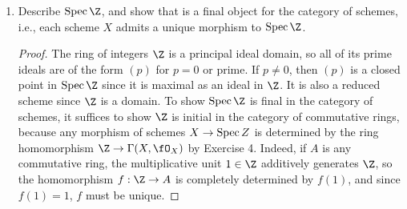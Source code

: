 \documentclass[a4paper]{article}
\begin{document}
\begin{enumerate} [label=\textbf{\arabic*.}, leftmargin=0em]
\begin{proof}
    We want to show the homomorphism between global sections $A \to \Gamma(X, \fO_X)$ completely determines the morphism $f : X \to \spec{B}$. We can check this locally on $X$. Let $V = \spec{B}$ be an open affine subset of $X$. We also have a homomorphism of global sections $A \to \Gamma(V, \fO_X) = B$ by composing with the inclusion morphism, which fits into the following commutative diagram
    \[ \begin{tikzcd}
        & {\Gamma(X, \fO_X)} \arrow[rd] &                               \\
A \arrow[ru] \arrow[rr] &                               & {\Gamma(\spec{B}, \fO_X) = B}
    \end{tikzcd} \]
    where $\Gamma(X, \fO_X) \to B$ is the natural restriction homomorphism. By equivalence of the category of rings and affine schemes, we conclude that $\alpha$ is injective.

    It remains to show $\alpha$ is surjective. Let $\varphi : A \to \Gamma(X, \fO_X)$ be a homomorphism of global sections. For each $x \in X$, let $\goth{m}_x$ be the maximal ideal of $\fO_{x, X}$, and let $i_x : \Gamma(X, \fO_X) \to \fO_{x, X}$ be the natural map. Then define $\tilde{\varphi} : X \to \spec{A}$ by $x \mapsto (i_x \circ \varphi)^{-1}(\goth{m}_x)$. This coincides with the case when $X$ is affine. Indeed, suppose $X = \spec{B}$ for some ring $B$, and let $\goth{p} \in \spec{B}$ corresponding to $x$. The inclusion homeomorphism $i_x : \Gamma(X, \fO_X) \to \fO_{x, X}$ is precisely the natural map $i_\goth{p} : B \to B_\goth{p}$ associated to localization. Thus, $i_x(\gm_x) = \goth{p} \in B$, and $\tilde{\varphi}(x) = \varphi^{-1}(\goth{p})$.
\end{proof}

\item Describe $\spec{\Z}$, and show that is a final object for the category of schemes, i.e., each scheme $X$ admits a unique morphism to $\spec{\Z}$.

\begin{proof}
    The ring of integers $\Z$ is a principal ideal domain, so all of its prime ideals are of the form $(p)$ for $p = 0$ or prime. If $p \neq 0$, then $(p)$ is a closed point in $\spec{\Z}$ since it is maximal as an ideal in $\Z$. It is also a reduced scheme since $\Z$ is a domain. To show $\spec{\Z}$ is final in the category of schemes, it suffices to show $\Z$ is initial in the category of commutative rings, because any morphism of schemes $X \to \operatorname{Spec}{Z}$ is determined by the ring homomorphism $\Z \to \Gamma(X, \fO_X)$ by Exercise 4. Indeed, if $A$ is any commutative ring, the multiplicative unit $1 \in \Z$ additively generates $\Z$, so the homomorphism $f : \Z \to A$ is completely determined by $f(1)$, and since $f(1) = 1$, $f$ must be unique.
\end{proof}


\end{enumerate}
\end{document}
